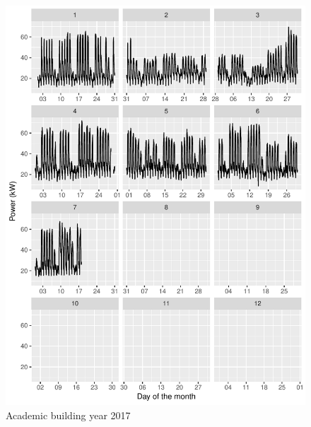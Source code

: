 \documentclass[11pt, oneside]{article}   	%
\begin{document}
\begin{figure}
\includegraphics[keepaspectratio]{acad_build_Y2017.pdf}
\caption{Academic building year 2017 }
\end{figure}
\end{document}
